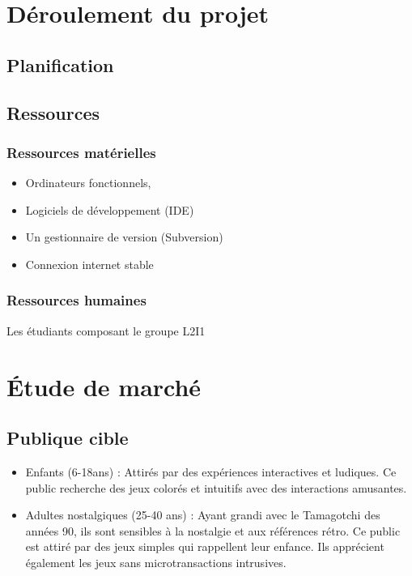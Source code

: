 \documentclass{rapportECL}
\begin{document}
\section{Déroulement du projet}
\subsection{Planification}
\subsection{Ressources}
\subsubsection{Ressources matérielles}
\begin{itemize}[label=\textbullet]
 \item Ordinateurs fonctionnels, 
 
 \item Logiciels de développement (IDE)

 \item Un gestionnaire de version (Subversion) 

 \item Connexion internet stable
\end{itemize}
\subsubsection{Ressources humaines}
Les étudiants composant le groupe L2I1

\section{Étude de marché}
\subsection{Publique cible}
\begin{itemize}[label=\textbullet]
\item Enfants (6-18ans) :
Attirés par des expériences interactives et ludiques. Ce public recherche des jeux colorés et
intuitifs avec des interactions amusantes.
\item Adultes nostalgiques (25-40 ans) :
Ayant grandi avec le Tamagotchi des années 90, ils sont sensibles à la nostalgie et aux références
rétro. Ce public est attiré par des jeux simples qui rappellent leur enfance. Ils apprécient
également les jeux sans microtransactions intrusives.
\end{itemize}
\end{document}
